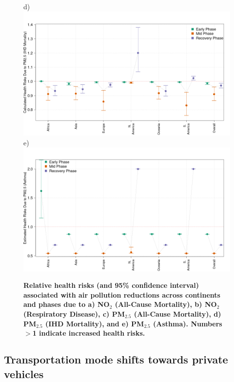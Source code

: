 \documentclass[preprint,10pt]{elsarticle} %
\begin{document}
\begin{figure}
\scriptsize{d)}\includegraphics[trim={0 0 25 23},clip,scale=0.23]{Images/pm25ihdrisks.png}
\\
\scriptsize{e)}\includegraphics[trim={0 0 25 23},clip,scale=0.23]{Images/pm25asthmarisks.png}
\caption{\bf Relative health risks (and 95\% confidence interval) associated with air pollution reductions across continents and phases due to a) NO$_{2}$ (All-Cause Mortality), b) NO$_{2}$ (Respiratory Disease), c) PM$_{2.5}$ (All-Cause Mortality), d) PM$_{2.5}$ (IHD Mortality), and e) PM$_{2.5}$ (Asthma). Numbers $>$1 indicate increased health risks.}
 \label{fig:risks}
\end{figure}



\subsection*{Transportation mode shifts towards private vehicles}
\end{document}
